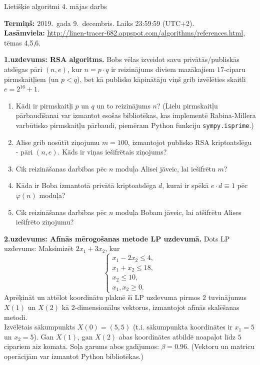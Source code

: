 \documentclass[11pt]{article}
\begin{document}
\thispagestyle{empty}

{\Large Lietišķie algoritmi \textendash{} 4. mājas darbs}

{\footnotesize
{\bf Termiņš:} 2019.\ gada 9.\ decembris. Laiks 23:59:59 (UTC+2).\\
{\bf Lasāmviela:} \url{http://linen-tracer-682.appspot.com/algorithms/references.html}, tēmas 4,5,6.
}

\vspace{6pt}
{\bf 1.uzdevums: RSA algoritms.} 
Bobs vēlas izveidot savu privātās/publiskās 
atslēgas pāri $(n,e)$, kur $n = p \cdot q$ ir reizinājums diviem 
mazākajiem $17$-ciparu pirmskaitļiem (un $p<q$), bet kā 
publisko kāpinātāju viņš grib izvēlēties skaitli $e = 2^{16} + 1$.
\begin{enumerate}[label=(\alph*)]
\item Kādi ir pirmskaitļi $p$ un $q$ un to reizinājums $n$?
(Lielu pirmskaitļu pārbaudīšanai var izmantot esošas bibliotēkas, kas
implementē Rabina-Millera varbūtisko pirmskaitļu pārbaudi, 
piemēram Python funkciju {\tt sympy.isprime}.)
\item Alise grib nosūtīt ziņojumu $m = 100$, izmantojot 
publisko RSA kriptoatslēgu - pāri $(n,e)$. Kāds ir viņas 
iešifrētais ziņojums?
\item Cik reizināšanas darbības pēc $n$ moduļa Alisei jāveic, lai
iešifrētu $m$?
\item Kāda ir Boba izmantotā privātā kriptoatslēga $d$, kurai 
ir spēkā $e \cdot d \equiv 1$ pēc $\varphi(n)$ moduļa?
\item Cik reizināšanas darbības pēc $n$ moduļa Bobam jāveic, lai 
atšifrētu Alises iešifrēto ziņojumu?
\end{enumerate}


\vspace{6pt}
{\bf 2.uzdevums: Afīnās mērogošanas metode LP uzdevumā.}
Dots LP uzdevums: Maksimizēt $2x_1 + 3x_2$, kur
$$\left\{ \begin{array}{l}
x_1 - 2x_2 \leq 4,\\
x_1 + x_2 \leq 18,\\
x_2 \leq 10,\\
x_1,x_2 \geq 0.
\end{array} \right.$$
Aprēķināt un attēlot koordinātu plaknē šī LP uzdevuma pirmos $2$ tuvinājumus 
$X(1)$ un $X(2)$ kā $2$-dimensionālus vektorus, izmantojot 
afīnās skalēšanas metodi.\\ 
Izvēlētais sākumpunkts $X(0) = (5,5)$ (t.i. sākumpunkta
koordinātes ir $x_1 = 5$ un $x_2 = 5$). Gan $X(1)$, gan $X(2)$ abas koordinātes
atbildē noapaļot līdz $5$ cipariem aiz komata. Soļa garums abos 
gadījumos: $\beta = 0.96$. (Vektoru un matricu operācijām var izmantot Python bibliotēkas.)
\end{document}
